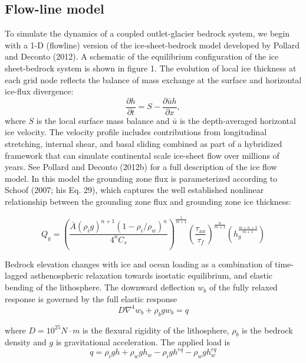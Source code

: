 \documentclass[tc, manuscript]{copernicus}
\begin{document}
\subsection{Flow-line model}
To simulate the dynamics of a coupled outlet-glacier bedrock system, we begin with a 1-D (flowline) version of the ice-sheet-bedrock model developed by Pollard and Deconto (2012). A schematic of the equilibrium configuration of the  ice sheet-bedrock system is shown in figure 1. The evolution of local ice thickness at each grid node reflects the balance of mass exchange at the surface and horizontal ice-flux divergence: 
\begin{equation}
\frac{\partial h}{\partial t} = S - \frac{\partial \bar{u}h}{\partial x},
\end{equation}
where $S$ is the local surface mass balance and $\bar{u}$ is the depth-averaged horizontal ice velocity. The velocity profile includes contributions from longitudinal stretching, internal shear, and basal sliding combined as part of a hybridized framework that can simulate continental scale ice-sheet flow over millions of years.
See Pollard and Deconto (2012b) for a full description of the ice flow model. In this model the grounding zone flux is parameterized according to Schoof (2007; his Eq. 29), which captures the well established nonlinear relationship between the grounding zone flux and grounding zone ice thickness:

\begin{equation}
Q_g = \left(\frac{\bar{A}(\rho_i g)^{n+1}(1-\rho_i/\rho_w)^n}{4^nC_s}\right)^{\frac{1}{m+1}} \left(\frac{\tau_{xx}}{\tau_f}\right)^{\frac{n}{m+1}}\left(h_g^{\frac{m+n+3}{m+1}}\right)
\end{equation}



Bedrock elevation changes with ice and ocean loading as a combination of time-lagged asthenospheric relaxation towards isostatic equilibrium, and elastic bending of the lithosphere. The downward deflection $w_b$ of the fully relaxed response is governed by the full elastic response 
\begin{equation}
D\nabla^4 w_b + \rho_b g w_b = q
\end{equation}

where $D = 10^{25} N\cdot m$ is the flexural rigidity of the lithosphere, $\rho_b$ is the bedrock density and $g$ is gravitational acceleration. The applied load is 
\begin{equation}
q = \rho_i g h + \rho_w g h_w - \rho_i g h^{eq} - \rho_w g h_w^{eq} 
\end{equation}
\end{document}
